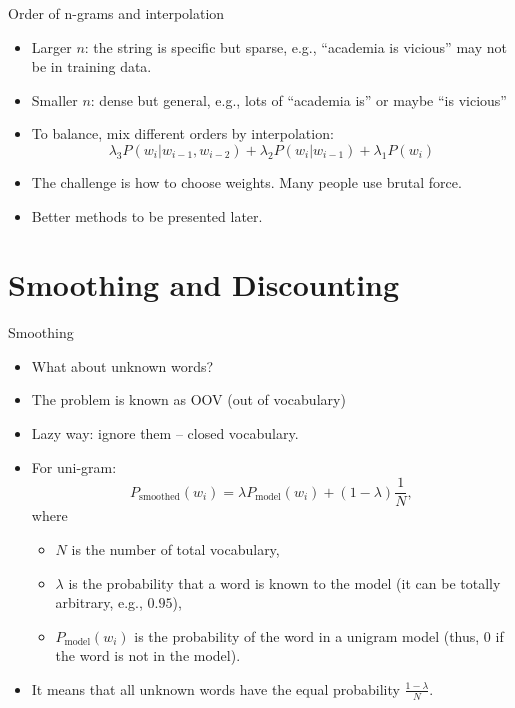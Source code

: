 \documentclass[11pt]{beamer}
\begin{document}
\begin{frame}{Order of n-grams and interpolation}
 \begin{itemize}[<+->]
  \item Larger $n$: the string is specific but sparse, e.g., ``academia is vicious'' may not be in training data.
  \item Smaller $n$: dense but general, e.g., lots of ``academia is'' or maybe ``is vicious''
  \item To balance, mix different orders by interpolation: 
  $$\lambda_3 P(w_i|w_{i-1}, w_{i-2}) + \lambda_2 P(w_i|w_{i-1}) + \lambda_1 P(w_i)$$
  \item The challenge is how to choose weights. Many people use brutal force. 
  \item Better methods to be presented later. 
 \end{itemize}
\end{frame}

\section{Smoothing and Discounting}

\begin{frame}{Smoothing}
 \begin{itemize}[<+->]
  \item What about unknown words? 
  \item The problem is known as OOV (out of vocabulary)
  \item Lazy way: ignore them -- closed vocabulary. 
  \item For uni-gram: $$P_{\text{smoothed}} (w_i) = \lambda P_{\text{model}}(w_i) + (1-\lambda) \frac{1}{N},$$ where 
  \begin{itemize}
   \item   $N$ is the number of total vocabulary, 
   \item $\lambda$ is the probability that a word is known to the model (it can be totally arbitrary, e.g., $0.95$), 
   \item $P_{\text{model}}(w_i)$ is the probability of the word in a unigram model (thus, 0 if the word is not in the model). 
  \end{itemize}
  \item It means that all unknown words have the equal probability $\frac{1-\lambda}{N}$. 
 \end{itemize}
\end{frame}
\end{document}
